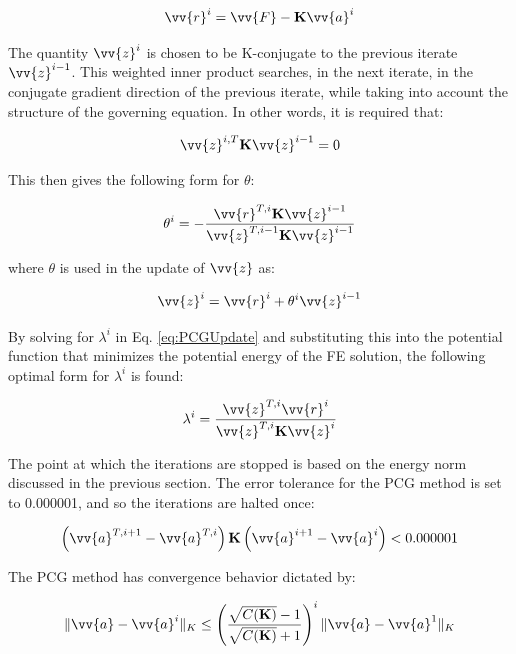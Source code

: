 \documentclass[10pt]{article}
\begin{document}
\begin{equation}
\vv{r}^i=\vv{F}-\textbf{K}\vv{a}^i
\end{equation}

The quantity \(\vv{z}^i\) is chosen to be K-conjugate to the previous iterate \(\vv{z}^{i-1}\). This weighted inner product searches, in the next iterate, in the conjugate gradient direction of the previous iterate, while taking into account the structure of the governing equation. In other words, it is required that:

\begin{equation}
\vv{z}^{i,T}\textbf{K}\vv{z}^{i-1}=0
\end{equation}

This then gives the following form for \(\theta\):

\begin{equation}
\theta^i=-\frac{\vv{r}^{T,i}\textbf{K}\vv{z}^{i-1}}{\vv{z}^{T,i-1}\textbf{K}\vv{z}^{i-1}}
\end{equation}

where \(\theta\) is used in the update of \(\vv{z}\) as:

\begin{equation}
\vv{z}^i=\vv{r}^i+\theta^i\vv{z}^{i-1}
\end{equation}

By solving for \(\lambda^i\) in Eq. \eqref{eq:PCGUpdate} and substituting this into the potential function that minimizes the potential energy of the FE solution, the following optimal form for \(\lambda^i\) is found:

\begin{equation}
\lambda^i=\frac{\vv{z}^{T,i}\vv{r}^i}{\vv{z}^{T,i}\textbf{K}\vv{z}^i}
\end{equation}

The point at which the iterations are stopped is based on the energy norm discussed in the previous section. The error tolerance for the PCG method is set to 0.000001, and so the iterations are halted once:

\begin{equation}
\label{eq:PCGError}
\left(\vv{a}^{T,i+1}-\vv{a}^{T,i}\right)\textbf{K}\left(\vv{a}^{i+1}-\vv{a}^i\right)<0.000001
\end{equation}

The PCG method has convergence behavior dictated by:

\begin{equation}
\label{eq:PCGConvergence}
\|\vv{a}-\vv{a}^{i}\|_K\leq\left(\frac{\sqrt{C(\textbf{K})}-1}{\sqrt{C(\textbf{K})}+1}\right)^i\|\vv{a}-\vv{a}^1\|_K
\end{equation}
\end{document}
